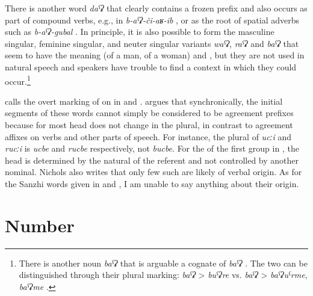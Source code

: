 There is another word \textit{daˁʡ}  that clearly contains a frozen  prefix and also occurs as part of compound verbs, e.g., in \textit{b-aˁʡ-či-aʁ-ib} , or as the root of spatial adverbs such as \textit{b-aˁʡ-gubal} . In principle, it is also possible to form the masculine singular, feminine singular, and neuter singular variants \textit{waˁʡ}, \textit{raˁʡ} and \textit{baˁʡ} that seem to have the meaning  (of a man, of a woman) and , but they are not used in natural speech and speakers have trouble to find a context in which they could occur.\footnote{There is another noun \textit{baˁʡ}  that is arguable a cognate of \textit{baˁʡ} . The two  can be distinguished through their plural marking: \textit{baˁʡ} > \textit{buˁʡre}  vs. \textit{baˁʡ} > \textit{baˁʡuˁrme}, \textit{baˁʡme} .}

\citet{Nichols2007} calls the overt marking of  on  in  and  . \citet{Nichols2007} argues that synchronically, the initial segments of these words cannot simply be considered to be  agreement prefixes because for most  head  does not change in the plural, in contrast to agreement affixes on verbs and other parts of speech. For instance, the plural of \textit{ucːi}  and \textit{rucːi}  is \textit{ucbe} and \textit{rucbe} respectively, not \textit{bucbe}. For the  of the first group in , the head  is determined by the natural  of the referent and not controlled by another nominal. Nichols also writes that only few such  are likely of verbal origin. As for the Sanzhi words given in  and , I am unable to say anything about their origin.



\section{Number}
\label{sec:nounnumber}

